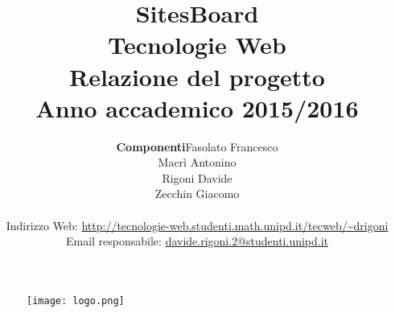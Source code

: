 \documentclass[12pt]{article}
\begin{document}
\begin{figure}
\centering
\texttt{[image: logo.png]}
\end{figure} 

\title{ \textbf{{\Huge SitesBoard}}\vspace{2cm} \\ {\Huge Tecnologie Web \\ Relazione del progetto} \\ {\Large Anno accademico 2015/2016} }
 
\author{
\begin{tabular}{r|l}
\textbf{Componenti} & Fasolato Francesco\\
&Macrì Antonino\\
&Rigoni Davide\\
&Zecchin Giacomo
\end{tabular}\vspace{0.5cm} \\
	Indirizzo Web: \url{http://tecnologie-web.studenti.math.unipd.it/tecweb/~drigoni}\vspace{0.3cm} \\
		Email responsabile: \href{mailto:davide.rigoni.2@studenti.unipd.it}{davide.rigoni.2@studenti.unipd.it} 
}

\maketitle
\thispagestyle{empty}


\newpage


\pagestyle{fancy}
\lhead{}
\cfoot{}
\renewcommand{\footrulewidth}{0.5pt}

\tableofcontents %



\newpage
\end{document}
